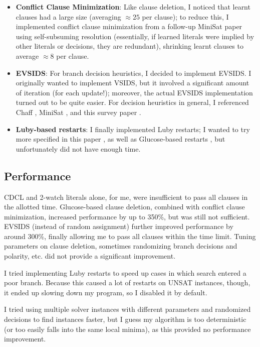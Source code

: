\documentclass[11pt]{article}
\begin{document}
\begin{itemize}
    \item \textbf{Conflict Clause Minimization}: Like clause deletion, I noticed that learnt clauses
        had a large size (averaging $\approx 25$ per clause); to reduce this, I implemented conflict
        clause minimization from a follow-up MiniSat paper \cite{CCM} using self-subsuming
        resolution (essentially, if learned literals were implied by other literals or decisions,
        they are redundant), shrinking learnt clauses to average $\approx 8$ per clause.
    \item \textbf{EVSIDS}: For branch decision heuristics, I decided to implement EVSIDS. I
        originally wanted to implement VSIDS, but it involved a significant amount of iteration (for
        each update!); moreover, the actual EVSIDS implementation turned out to be quite easier.
        For decision heuristics in general, I referenced Chaff \cite{Chaff}, MiniSat \cite{Een}, and
        this survey paper \cite{Biere15}. 
    \item \textbf{Luby-based restarts}: I finally implemented Luby restarts; I wanted to try more
        specified in this paper \cite{Luby}, as well as Glucose-based restarts \cite{Glucose}, but
        unfortunately did not have enough time.
\end{itemize}

\subsection{Performance}

CDCL and 2-watch literals alone, for me, were insufficient to pass all clauses in the allotted time.
Glucose-based clause deletion, combined with conflict clause minimization, increased performance by
up to 350\%, but was still not sufficient. EVSIDS (instead of random assignment) further improved
performance by around 300\%, finally allowing me to pass all clauses within the time limit. Tuning
parameters on clause deletion, sometimes randomizing branch decisions and polarity, etc. did not
provide a significant improvement.

I tried implementing Luby restarts to speed up cases in which search entered a poor branch. Because
this caused a lot of restarts on UNSAT instances, though, it ended up slowing down my program, so I
disabled it by default.

I tried using multiple solver instances with different parameters and randomized decisions to find
instances faster, but I guess my algorithm is too deterministic (or too easily falls into the same
local minima), as this provided no performance improvement.
\end{document}

